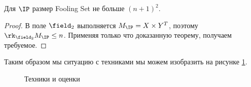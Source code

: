 \begin{corollary}
    Для $\IP$ размер Fooling Set не больше $(n + 1)^2$.
\end{corollary}

\begin{proof}
    В поле $\field_2$ выполняется $M_{\IP} = X \times Y^T$, поэтому $\rk_{\field_2} M_{\IP} \le
    n$. Применяя только что доказанную теорему, получаем требуемое.
\end{proof}

Таким образом мы ситуацию с техниками мы можем изобразить на рисунке \ref{fig:techniques-and-functions}.
\begin{figure}[h]
    \centering
    
    \caption{Техники и оценки}
    \label{fig:techniques-and-functions}
\end{figure}